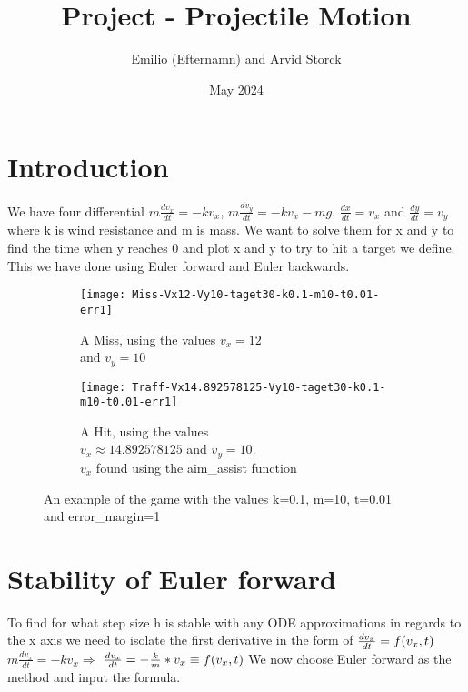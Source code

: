 \documentclass{article}
\title{Project - Projectile Motion}
\author{Emilio (Efternamn) and Arvid Storck}
\date{May 2024}
\begin{document}
\maketitle
\section{Introduction}
We have four differential $m\frac{dv_x}{dt}=-kv_x$, $m\frac{dv_y}{dt}=-kv_x-mg$, $\frac{dx}{dt}=v_x$ and $\frac{dy}{dt}=v_y$ where k is wind resistance and m is mass. We want to solve them for x and y to find the time when y reaches 0 and plot x and y to try to hit a target we define. This we have done using Euler forward and Euler backwards.

\begin{figure}[h]

\begin{subfigure}{0.49\textwidth}
\texttt{[image: Miss-Vx12-Vy10-taget30-k0.1-m10-t0.01-err1]} 
\caption{A Miss, using the values $v_x=12$\\ and $v_y=10$\\ }
\label{fig:subim1}
\end{subfigure}
\begin{subfigure}{0.49\textwidth}
\texttt{[image: Traff-Vx14.892578125-Vy10-taget30-k0.1-m10-t0.01-err1]}
\caption{A Hit, using the values\\ $v_x\approx14.892578125$ and $v_y=10$.\\$v_x$ found using the aim\_assist function}
\label{fig:subim2}
\end{subfigure}

\caption{An example of the game with the values k=0.1, m=10, t=0.01\\ and error\_margin=1}
\label{fig:image2}
\end{figure}

\section{Stability of Euler forward}

To find for what step size h is stable with any ODE approximations in regards to the x axis we need to isolate the first derivative in the form of $\frac{dv_x}{dt}=f(v_x,t)\newline\newline$
$m\frac{dv_x}{dt}=-kv_x\Rightarrow$
$\frac{dv_x}{dt}=-\frac{k}{m}*v_x\equiv f(v_x,t)\newline\newline$
We now choose Euler forward as the method and input the formula.
\end{document}
